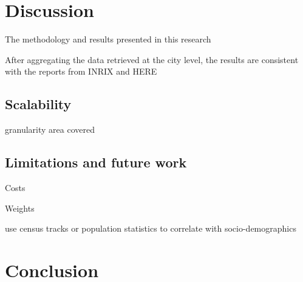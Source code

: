 \documentclass[a4paper]{jpconf}
\begin{document}
\section{Discussion}
\indent The methodology and results presented in this research 

\indent After aggregating the data retrieved at the city level, the results are consistent with the reports from INRIX and HERE 

\subsection{Scalability}
granularity
area covered



\subsection{Limitations and future work}
\indent Costs

\indent Weights

\indent use census tracks or population statistics to correlate with socio-demographics 
\section{Conclusion}
\end{document}
